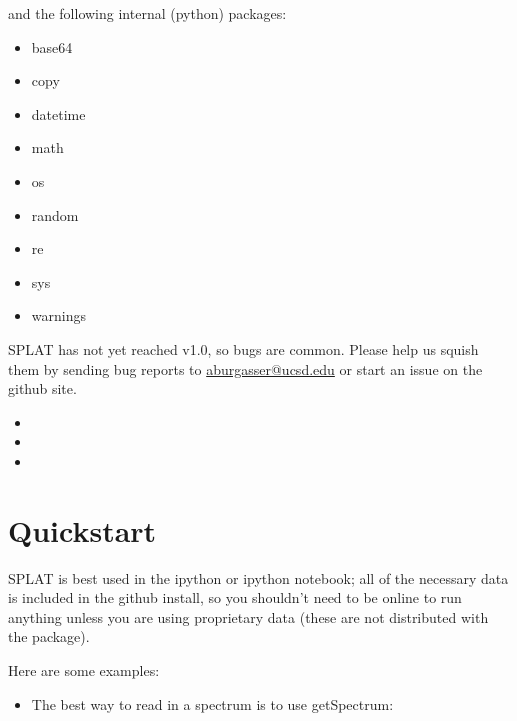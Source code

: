 \documentclass[letterpaper,10pt,english]{sphinxmanual}
\begin{document}
and the following internal (python) packages:
\begin{itemize}
\item {} 
base64

\item {} 
copy

\item {} 
datetime

\item {} 
math

\item {} 
os

\item {} 
random

\item {} 
re

\item {} 
sys

\item {} 
warnings

\end{itemize}

SPLAT has not yet reached v1.0, so bugs are common. Please help us squish them by
sending bug reports to \href{mailto:aburgasser@ucsd.edu}{aburgasser@ucsd.edu} or start an issue on the github site.
\begin{itemize}
\item {} 

\item {} 

\item {} 

\end{itemize}


\section{Quickstart}
\label{quickstart::doc}\label{quickstart:quickstart}
SPLAT is best used in the ipython or ipython notebook; all of the necessary data is
included in the github install, so you shouldn't need to be online to run anything
unless you are using proprietary data (these are not distributed with the package).

Here are some examples:
\begin{itemize}
\item {} 
The best way to read in a spectrum is to use getSpectrum:

\end{itemize}
\end{document}
